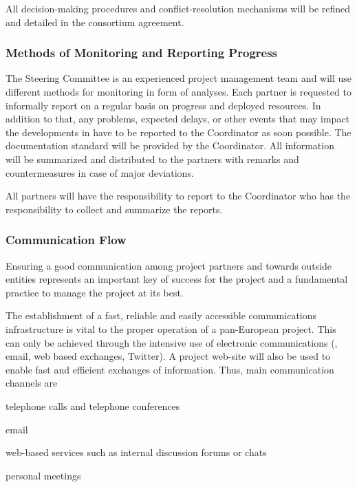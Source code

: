 All decision-making procedures and conflict-resolution mechanisms will
be refined and detailed in the consortium agreement.

\subsubsection{Methods of Monitoring and Reporting Progress}

The Steering Committee is an experienced project management team and will
use different methods for monitoring in form of analyses. Each partner is requested to informally report on a
regular basis on progress and deployed resources. In addition to that,
any problems, expected delays, or other events that may impact the
developments in \Project{} have to be reported to the Coordinator as
soon possible.  The documentation standard will be provided by the
Coordinator. All information will be summarized and
distributed to the partners with remarks and countermeasures in case
of major deviations.

All partners will have the responsibility to report to the
Coordinator who has the responsibility to
collect and summarize the reports.  



\subsubsection{Communication Flow}
\label{sec:mngt:comm}
Ensuring a good communication among project partners and towards
outside entities represents an important key of success for the
project and a fundamental practice to manage the project at its best.

The establishment of a fast, reliable and easily accessible
communications infrastructure is vital to the proper operation of a
pan-European project. This can only be achieved through the intensive
use of electronic communications (\eg, email, web based exchanges, Twitter). A
project web-site will also be used to enable fast and efficient
exchanges of information. Thus, main communication channels are
\begin{denseItemize}
\item telephone calls and telephone conferences
\item email
\item web-based services such as internal discussion forums or chats
\item personal meetings
\end{denseItemize}

